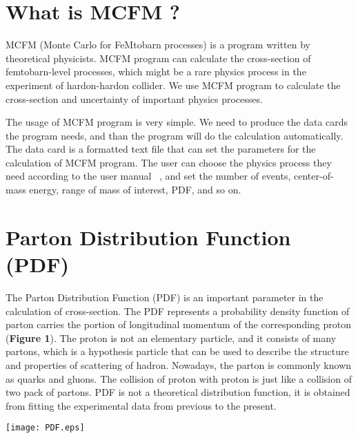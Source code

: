 \documentclass[a0,portrait]{a0poster}
\begin{document}
\begin{multicols}{2}
\section*{\color{Crimson} What is MCFM ?}

MCFM (Monte Carlo for FeMtobarn processes) is a program written by theoretical physicists. MCFM program can calculate the cross-section of femtobarn-level processes, which might be a rare physics process in the experiment of hardon-hardon collider. We use MCFM program to calculate the cross-section and uncertainty of important physics processes.

The usage of MCFM program is very simple. We need to produce the data cards the program needs, and than the program will do the calculation automatically. The data card is a formatted text file that can set the parameters for the calculation of MCFM program. The user can choose the physics process they need according to the user manual ~\cite{MCFM}, and set the number of events, center-of-mass energy, range of mass of interest, PDF, and so on.


\section*{\color{Crimson} Parton Distribution Function (PDF)}

The Parton Distribution Function (PDF) is an important parameter in the calculation of cross-section. The PDF represents a probability density function of parton carries the portion of longitudinal momentum of the corresponding proton ({\bf Figure 1}). The proton is not an elementary particle, and it consists of many partons, which is a hypothesis particle that can be used to describe the structure and properties of scattering of hadron. Nowadays, the parton is commonly known as quarks and gluons. The collision of proton with proton is just like a collision of two pack of partons. PDF is not a theoretical distribution function, it is obtained from fitting the experimental data from previous to the present.


\begin{center}
\texttt{[image: PDF.eps]}
\end{center}


\end{multicols}
\end{document}
